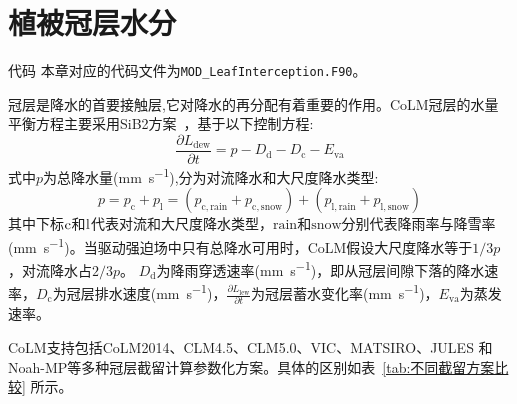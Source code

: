 \chapter{植被冠层水分}\label{植被冠层截留}

\begin{mymdframed}{代码}
  本章对应的代码文件为\texttt{MOD\_LeafInterception.F90}。
\end{mymdframed}

冠层是降水的首要接触层,它对降水的再分配有着重要的作用。CoLM冠层的水量平衡方程主要采用SiB2方案~\citep{sellers1996revised}，基于以下控制方程:
\begin{equation}\label{eq:冠层水量控制方程}
  \frac{\partial L_{\mathrm{dew}}}{\partial t} = p-D_{\mathrm{d}}-D_{\mathrm{c}}-E_{\mathrm{va}}
\end{equation}
式中$p$为总降水量(\unit{mm.s^{-1}}),分为对流降水和大尺度降水类型:
\begin{equation}\label{eq:降水类型}
  p=p_{\mathrm{c}}+p_{\mathrm{l}}=\left(p_{\mathrm{c,rain}}+p_{\mathrm{c,snow}}\right)+\left(p_{\mathrm{l,rain}}+p_{\mathrm{l,snow}}\right)
\end{equation}
其中下标$\rm c$和$\rm l$代表对流和大尺度降水类型，$\text{rain}$和$\text{snow}$分别代表降雨率与降雪率(\unit{mm.s^{-1}})。当驱动强迫场中只有总降水可用时，CoLM假设大尺度降水等于$1/3p$，对流降水占$2/3p$。
$D_{\mathrm {d}} $为降雨穿透速率(\unit{mm.s^{-1}})，即从冠层间隙下落的降水速率，$D_{\mathrm {c}} $为冠层排水速度(\unit{mm.s^{-1}})，$\frac{\partial L_{\mathrm{lew}}}{\partial t}$为冠层蓄水变化率(\unit{mm.s^{-1}})，$E_{\mathrm{va}}$为蒸发速率。

CoLM支持包括CoLM2014、CLM4.5、CLM5.0、VIC、MATSIRO、JULES 和Noah-MP等多种冠层截留计算参数化方案。具体的区别如表~\ref{tab:不同截留方案比较} 所示。
%

